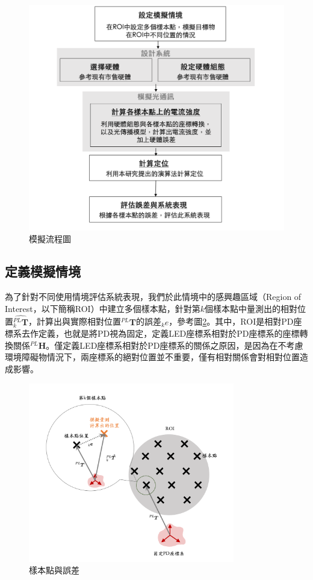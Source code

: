 \begin{figure}[ht]
    \centering
    \includegraphics[width=13cm]{ch4pic/simulation_flow.png}
    \caption{模擬流程圖}
    \label{pic:simulation_flow}
\end{figure}

\subsection{定義模擬情境}
\label{chp:scenario}

為了針對不同使用情境評估系統表現，我們於此情境中的感興趣區域（Region of Interest，以下簡稱ROI）中建立多個樣本點，針對第$k$個樣本點中量測出的相對位置$\hat{^{PL}_{k}\boldsymbol{T}}$，計算出與實際相對位置$^{PL}\boldsymbol{T}$的誤差$_k e$，參考圖\ref{pic:error_show}。其中，ROI是相對PD座標系去作定義，也就是將PD視為固定，定義LED座標系相對於PD座標系的座標轉換關係$^{PL}\boldsymbol{H}$。僅定義LED座標系相對於PD座標系的關係之原因，是因為在不考慮環境障礙物情況下，兩座標系的絕對位置並不重要，僅有相對關係會對相對位置造成影響。

\begin{figure}[ht]
    \centering
    \includegraphics[width=9cm]{ch4pic/error.png}
    \caption{樣本點與誤差}
    \label{pic:error_show}
\end{figure}

